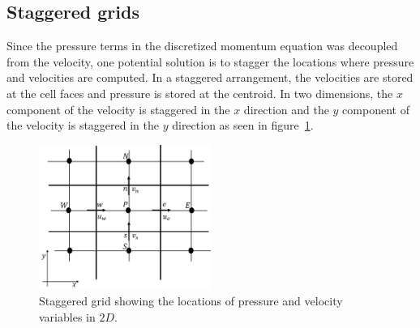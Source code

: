 \subsection{Staggered grids}\label{sec:pcorrstag}
Since the pressure terms in the discretized momentum equation was decoupled from the velocity, one potential solution is to stagger the locations where pressure and velocities are computed. In a staggered arrangement, the velocities are stored at the cell faces and pressure is stored at the centroid. In two dimensions, the $x$ component of the velocity is staggered in the $x$ direction and the $y$ component of the velocity is staggered in the $y$ direction as seen in figure~\ref{fig:stagger}. 
\begin{figure}[h!]
\centering
\captionsetup{justification=centering}
 \includegraphics[width=0.5\textwidth]{ch2_litsurvey/Figures/stag2ddomain.png}
\caption{Staggered grid showing the locations of pressure and velocity variables in $2D$.}
 \label{fig:stagger}
\end{figure}

